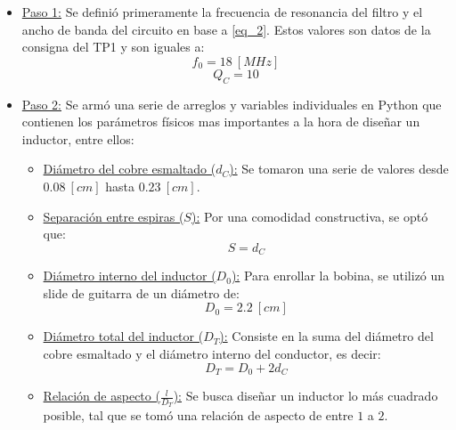 \documentclass[conference]{IEEEtran}
\begin{document}
\begin{itemize}
    \item \underline{Paso 1:} Se definió primeramente la frecuencia de resonancia del filtro y el ancho de banda del circuito en base a \eqref{eq_2}. Estos valores son datos de la consigna del TP1 y son iguales a:
        \begin{equation}
            f_{0} = 18 \ [MHz]
            \label{eq_9}
        \end{equation}
        \begin{equation}
            Q_{C} = 10
            \label{eq_10}
        \end{equation}
    
    \item \underline{Paso 2:} Se armó una serie de arreglos y variables individuales en Python que contienen los parámetros físicos mas importantes a la hora de diseñar un inductor, entre ellos:
    \begin{itemize}
        \item \underline{Diámetro del cobre esmaltado ($d_{C}$):} Se tomaron una serie de valores desde $0.08 \ [cm]$ hasta $0.23 \ [cm].$
        
        \item \underline{Separación entre espiras ($S$):} Por una comodidad constructiva, se optó que: 
        \begin{equation}
            S = d_{C}
            \label{eq_11}
        \end{equation}
        
        \item \underline{Diámetro interno del inductor ($D_{0}$):} Para enrollar la bobina, se utilizó un slide de guitarra \cite{B3} de un diámetro de:
        \begin{equation}
            D_{0} = 2.2 \ [cm]
            \label{eq_12}
        \end{equation}
        
        \item \underline{Diámetro total del inductor ($D_{T}$):} Consiste en la suma del diámetro del cobre esmaltado y el diámetro interno del conductor, es decir:
        \begin{equation}
            D_{T} = D_{0} + 2d_{C}
            \label{eq_13}
        \end{equation}
        
        \item \underline{Relación de aspecto ($\frac{l}{D_{T}}$):} Se busca diseñar un inductor lo más cuadrado posible, tal que se tomó una relación de aspecto de entre $1$ a $2$.
        

\end{itemize}
\end{itemize}
\end{document}
